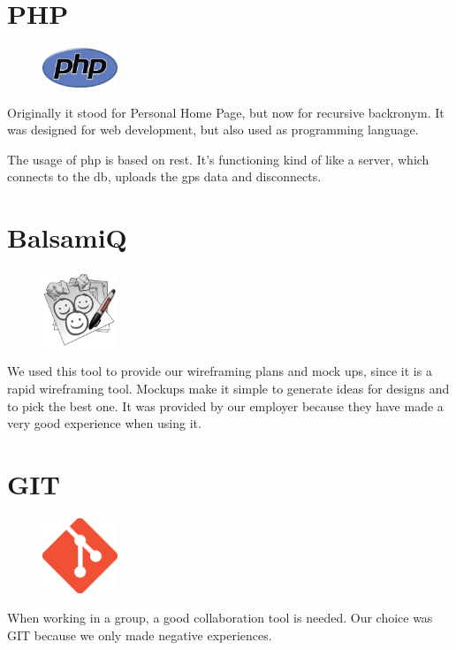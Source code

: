 \section{PHP}
\begin{figure}
  \begin{center}
    \includegraphics[width=0.2\textwidth] {bilder/php}
  \end{center}
\end{figure}
Originally it stood for Personal Home Page, but now for recursive backronym. It was designed for web development, but also used as programming language. 

The usage of \gls{php} is based on \gls{rest}. It's functioning kind of like a server, which connects to the \gls{db}, uploads the \gls{gps} data and disconnects.

\section{BalsamiQ}
\begin{figure}
  \begin{center}
    \includegraphics[width=0.2\textwidth] {bilder/balsamiq}
  \end{center}
\end{figure}
We used this tool to provide our wireframing plans and mock ups, since it is a rapid wireframing tool. Mockups make it simple to generate ideas for designs and to pick the best one. It was provided by our employer because they have made a very good experience when using it.

\section{GIT}
\begin{figure}
  \begin{center}
    \includegraphics[width=0.2\textwidth] {bilder/git}
  \end{center}
\end{figure}
When working in a group, a good collaboration tool is needed. Our choice was GIT because we only made negative experiences.


